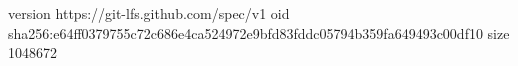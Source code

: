 version https://git-lfs.github.com/spec/v1
oid sha256:e64ff0379755c72c686e4ca524972e9bfd83fddc05794b359fa649493c00df10
size 1048672
